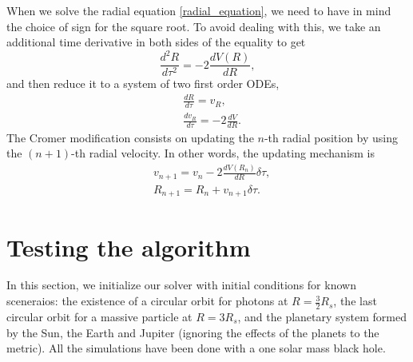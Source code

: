 \documentclass[journal, a4paper]{IEEEtran}
\begin{document}
When we solve the radial equation \ref{radial_equation}, we need to have in mind the choice of sign for the square root. To avoid dealing with this, we take an additional time derivative in both sides of the equality to get
\begin{equation}
	\frac{d^2R}{d \tau^2} = - 2 \frac{d V(R)}{dR},
\end{equation}
and then reduce it to a system of two first order ODEs,
\begin{equation}
	\begin{split}
		&\frac{dR}{d \tau } = v_R, \\
		&\frac{dv_R}{d \tau} = - 2 \frac{dV}{dR}.
	\end{split}
\end{equation}
The Cromer modification consists on updating the $n$-th radial position by using the $(n+1)$-th radial velocity. In other words, the updating mechanism is
\begin{equation}
	\begin{split}
		&v_{n+1} = v_{n} - 2 \frac{dV(R_n)}{dR}  \delta \tau , \\
		&R_{n+1} = R_n + v_{n+1} \delta \tau.  
	\end{split}
\end{equation}

\section{Testing the algorithm}
In this section, we initialize our solver with initial conditions for known sceneraios: the existence of a circular orbit for photons at $R=\frac{3}{2}R_s$, the last circular orbit for a massive particle at $R=3R_s$, and the planetary system formed by the Sun, the Earth and Jupiter (ignoring the effects of the planets to the metric). All the simulations have been done with a one solar mass black hole.
\end{document}
